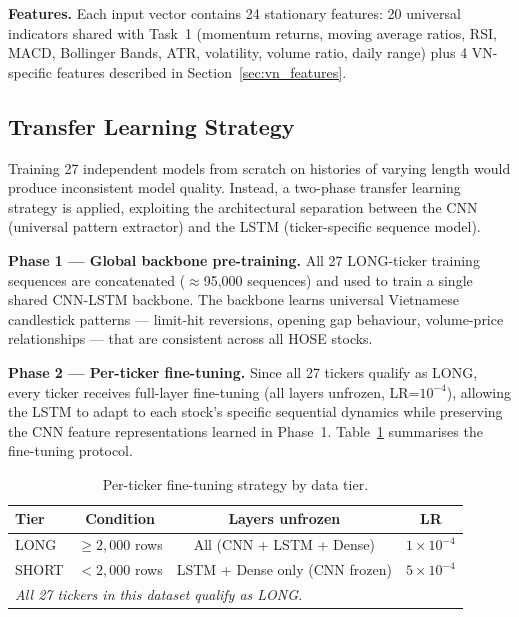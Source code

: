 \documentclass[12pt, a4paper]{article}
\begin{document}
\textbf{Features.} Each input vector contains 24 stationary features:
20 universal indicators shared with Task~1 (momentum returns, moving
average ratios, RSI, MACD, Bollinger Bands, ATR, volatility, volume
ratio, daily range) plus 4 VN-specific features described in
Section~\ref{sec:vn_features}.

\subsection{Transfer Learning Strategy}

Training 27 independent models from scratch on histories of varying
length would produce inconsistent model quality. Instead, a two-phase
transfer learning strategy is applied, exploiting the architectural
separation between the CNN (universal pattern extractor) and the LSTM
(ticker-specific sequence model).

\textbf{Phase 1 --- Global backbone pre-training.}
All 27 LONG-ticker training sequences are concatenated ($\approx$95{,}000
sequences) and used to train a single shared CNN-LSTM backbone.
The backbone learns universal Vietnamese candlestick patterns ---
limit-hit reversions, opening gap behaviour, volume-price relationships
--- that are consistent across all HOSE stocks.

\textbf{Phase 2 --- Per-ticker fine-tuning.}
Since all 27 tickers qualify as LONG, every ticker receives full-layer
fine-tuning (all layers unfrozen, LR=$10^{-4}$), allowing the LSTM
to adapt to each stock's specific sequential dynamics while preserving
the CNN feature representations learned in Phase~1.
Table~\ref{tab:tl_strategy} summarises the fine-tuning protocol.

\begin{table}[h]
\centering
\caption{Per-ticker fine-tuning strategy by data tier.}
\label{tab:tl_strategy}
\renewcommand{\arraystretch}{1.3}
\begin{tabular}{lccc}
\hline
\textbf{Tier} & \textbf{Condition} & \textbf{Layers unfrozen} & \textbf{LR} \\
\hline
LONG & $\geq 2{,}000$ rows & All (CNN + LSTM + Dense) & $1\times10^{-4}$ \\
SHORT & $< 2{,}000$ rows & LSTM + Dense only (CNN frozen) & $5\times10^{-4}$ \\
\hline
\multicolumn{4}{l}{\textit{All 27 tickers in this dataset qualify as LONG.}} \\
\hline
\end{tabular}
\end{table}
\end{document}
